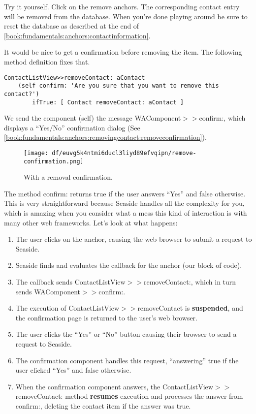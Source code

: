 \documentclass[a4paper,10pt,twoside]{book}
\newcommand{\ct}[1]{{\small\ttfamily\textup{#1}}}
\begin{document}
Try it yourself. Click on the remove anchors. The corresponding contact entry will be removed from the database. When you're done playing around be sure to reset the database as described at the end of \autoref{book:fundamentals:anchors:contactinformation}.

It would be nice to get a confirmation before removing the item. The following method definition fixes that.

\begin{lstlisting}
ContactListView>>removeContact: aContact
    (self confirm: 'Are you sure that you want to remove this contact?')
        ifTrue: [ Contact removeContact: aContact ]
\end{lstlisting}

We send the component (self) the message  \ct{WAComponent$>$$>$confirm:}, which displays a ``Yes$/$No'' confirmation dialog (See \autoref{book:fundamentals:anchors:removingcontact:removeconfirmation}).

\begin{figure}[h!tbp]
	\begin{center}
		\texttt{[image: df/euvg5k4ntmi6ducl3liyd89efvqipn/remove-confirmation.png]}
		\caption{With a removal confirmation.\label{book:fundamentals:anchors:removingcontact:removeconfirmation}}
	\end{center}
\end{figure}


The method \ct{confirm:} returns \ct{true} if the user answers ``Yes'' and \ct{false} otherwise. This is very straightforward because Seaside handles all the complexity for you, which is amazing when you consider what a mess this kind of interaction is with many other web frameworks. Let's look at what happens:

\begin{enumerate}
\item  The user clicks on the anchor, causing the web browser to submit a request to Seaside.
\item  Seaside finds and evaluates the callback for the anchor (our block of code).
\item  The callback sends \ct{ContactListView$>$$>$removeContact:}, which in turn sends  \ct{WAComponent$>$$>$confirm:}.
\item  The execution of \ct{ContactListView$>$$>$removeContact} is \textbf{suspended}, and the confirmation page is returned to the user's web browser.
\item  The user clicks the ``Yes'' or ``No'' button causing their browser to send a request to Seaside.
\item  The confirmation component handles this request, ``answering'' \ct{true} if the user clicked ``Yes'' and \ct{false} otherwise.
\item  When the confirmation component answers, the \ct{ContactListView$>$$>$removeContact:} method \textbf{resumes} execution and processes the answer from \ct{confirm:}, deleting the contact item if the answer was \ct{true}.
\end{enumerate}
\end{document}
